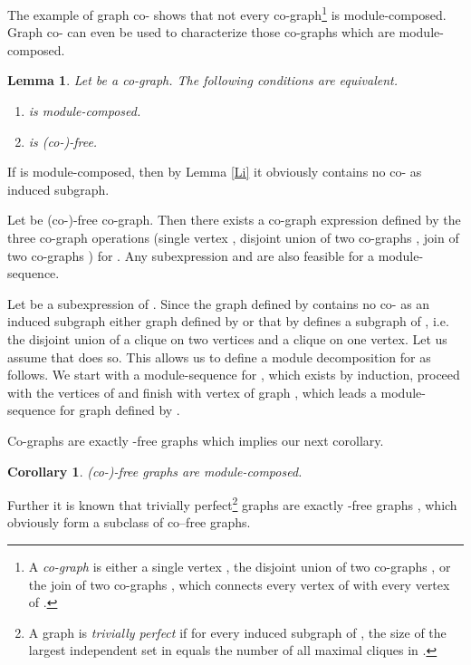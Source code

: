 \documentclass[11pt]{article}
\newtheorem{corollary}[theorem]{Corollary}
\newtheorem{lemma}[theorem]{Lemma}
\newenvironment{proof}{\noindent{\bf Proof~}}{\null\hfill \par\medskip}
\begin{document}
The example of graph co- shows that not every co-graph\footnote{A {\em co-graph} is either a  single vertex ,
the disjoint union  of two co-graphs , or the join   of two co-graphs , which connects every vertex of  with every vertex of . } is module-compo\-sed. Graph co- can even be used to characterize those co-graphs which are module-composed.


\begin{lemma}\label{Lco}
Let  be a co-graph. The following conditions are equivalent.
\begin{enumerate}
\item  is module-composed.

\item  is (co-)-free.
\end{enumerate}
\end{lemma}


\begin{proof}
If  is module-composed, then by Lemma \ref{Li} it obviously contains no co- as induced subgraph.

Let  be (co-)-free co-graph. Then there exists a co-graph expression  defined by the three co-graph operations (single vertex ,
disjoint union  of two co-graphs , join   of two co-graphs ) for .  Any subexpression  and  
are also feasible for a module-sequence. 

Let 
be a subexpression of . Since the graph defined by  contains no co- as an induced subgraph either graph defined by  or that by  defines a subgraph of , i.e. the disjoint union of a clique 
on two vertices and a clique on one vertex. Let us assume that   does so.  This allows us to define
a module decomposition for  as follows. We start with
a module-sequence for , which exists by induction, proceed with
the vertices of  and finish with vertex of graph ,
which leads a module-sequence for graph defined by .
\end{proof}

Co-graphs are exactly -free graphs which implies our next corollary.

\begin{corollary}
(co-)-free graphs are module-composed.
\end{corollary}


Further it is  known that trivially perfect\footnote{
A graph is {\em trivially perfect} if for every induced subgraph  of ,
the size of the largest independent set in  equals the number of  all maximal cliques in .} graphs are exactly  -free graphs
\cite{Gol78}, which obviously form a subclass of co--free graphs.
\end{document}
